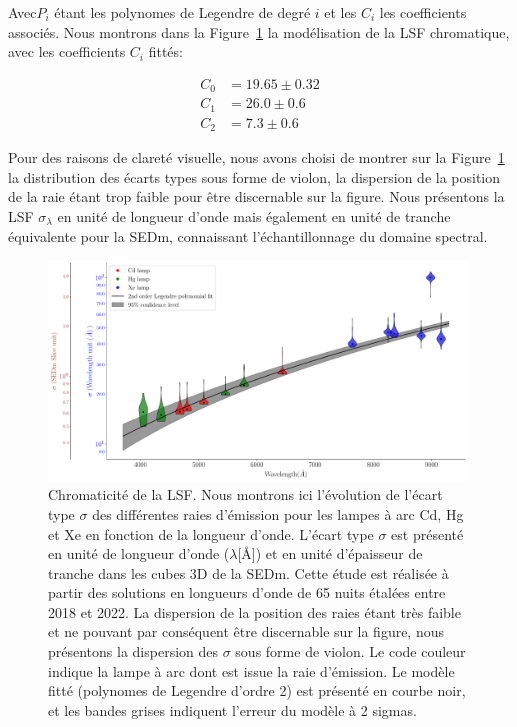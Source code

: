 \documentclass[../main/main.tex]{subfiles}
\begin{document}
Avec$P_{i}$ étant les polynomes de Legendre de degré $i$ et les $C_{i}$
les coefficients associés. Nous montrons dans la Figure~\ref{fig:lsf} la modélisation de la LSF
chromatique, avec les coefficients $C_{i}$ fittés:

\begin{align*}
  C_{0}&=19.65\pm 0.32\\
  C_{1}&=26.0\pm 0.6\\
  C_{2}&=7.3\pm 0.6
\end{align*}

Pour des raisons de clareté visuelle, nous avons choisi de montrer sur
la Figure~\ref{fig:lsf} la distribution des écarts types sous forme de
violon, la dispersion de la position de la raie étant trop faible pour
être discernable sur la figure. Nous présentons la LSF
$\sigma_{\lambda}$ en unité de longueur d'onde mais également en unité
de tranche équivalente pour la SEDm,
connaissant l'échantillonnage du domaine spectral.

\begin{figure}[h!]
  \centering
  \includegraphics[width=0.99\textwidth]{../figures/06_irf/LSF.pdf}
  \caption[Chromaticité de la LSF]{Chromaticité de la LSF. Nous montrons
  ici l'évolution de l'écart type $\sigma$ des différentes raies
  d'émission pour les lampes à arc Cd, Hg et Xe en fonction de la
  longueur d'onde. L'écart type $\sigma$ est présenté en unité de
  longueur d'onde ($\lambda$[\AA]) et en unité d'épaisseur de tranche
  dans les cubes 3D de la SEDm. Cette étude est réalisée à partir des
  solutions en longueurs d'onde de 65 nuits étalées entre 2018 et
  2022. La dispersion de la position des raies étant très faible et ne
  pouvant par conséquent être discernable sur la figure, nous présentons
la dispersion des $\sigma$ sous forme de violon. Le code couleur indique
la lampe à arc dont est issue la raie d'émission. Le modèle fitté
(polynomes de Legendre d'ordre 2) est présenté en courbe noir, et les
bandes grises indiquent l'erreur du modèle à 2 sigmas. }
  \label{fig:lsf}
\end{figure}
\end{document}
